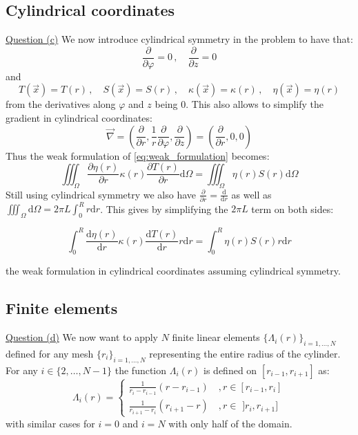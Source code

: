 \subsection{Cylindrical coordinates}
\underline{Question (c)}
We now introduce cylindrical symmetry in the problem to have that:
\begin{equation}
    \frac{\partial}{\partial \varphi} = 0 \, ,\quad \frac{\partial}{\partial z} = 0
\end{equation}
and
\begin{equation}
    T(\vec{x}) = T(r) \, , \quad S(\vec{x}) = S(r) \, , \quad \kappa(\vec{x}) = \kappa(r) \, , \quad \eta(\vec{x}) = \eta(r)
\end{equation}
from the derivatives along $\varphi$ and $z$ being 0. This also allows to simplify the gradient in cylindrical coordinates:
\begin{equation}
    \vec{\nabla} = \left(\frac{\partial}{\partial r}, \frac{1}{r}\frac{\partial}{\partial \varphi}, \frac{\partial}{\partial z}\right) = \left(\frac{\partial}{\partial r}, 0, 0\right)
\end{equation}
Thus the weak formulation of \autoref{eq:weak_formulation} becomes:
\begin{equation}
    \iiint_\Omega \frac{\partial \eta (r)}{\partial r} \kappa(r) \frac{\partial T(r)}{\partial r} \mathrm{d}\Omega = \iiint_\Omega \eta(r)S(r) \mathrm{d}\Omega
\end{equation}
Still using cylindrical symmetry we also have $\frac{\partial}{\partial r} = \frac{\mathrm{d}}{\mathrm{d}r}$ as well as $\iiint_\Omega \mathrm{d}\Omega = 2\pi L \int_0^R r \mathrm{d}r$. This gives by simplifying the $2\pi L$ term on both sides:

\begin{equation}
    \int_0^R \frac{\mathrm{d} \eta (r)}{\mathrm{d} r} \kappa(r) \frac{\mathrm{d} T(r)}{\mathrm{d} r} r \mathrm{d}r = \int_0^R \eta(r)S(r) r \mathrm{d}r
    \label{eq:formulation_cylindrical}
\end{equation}

the weak formulation in cylindrical coordinates assuming cylindrical symmetry.

\subsection{Finite elements}
\underline{Question (d)}
We now want to apply $N$ finite linear elements $\{\Lambda_i(r)\}_{i=1,\ldots,N}$ defined for any mesh $\{r_i\}_{i=1,\ldots,N}$ representing the entire radius of the cylinder. For any $i \in \{2,\ldots,N-1\}$ the function $\Lambda_i(r)$ is defined on $[r_{i-1}, r_{i+1}]$ as:
\begin{equation}
    \Lambda_i(r) = \begin{cases}
        \frac{1}{r_i - r_{i-1}}(r - r_{i-1}) \quad , r \in [r_{i-1}, r_i] \\
        \frac{1}{r_{i+1} - r_i}(r_{i+1} - r) \quad , r \in \,\, ]r_i, r_{i+1}]
    \end{cases}
\end{equation}
with similar cases for $i=0$ and $i=N$ with only half of the domain.

